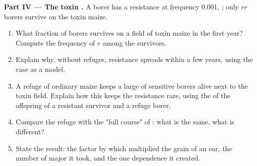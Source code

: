 \begin{problem}
\medskip
\noindent\textbf{Part IV --- The toxin .}
A borer  has a resistance  at frequency 0.001,
; only $rr$ borers survive on the toxin maize.
\begin{enumerate}[resume]
  \item What fraction of borers survives on a field of toxin maize in
        the first year? Compute the frequency of $r$ among the
        survivors.
  \item Explain why, without refuges, resistance spreads within a few
        years, using the  case as a model.
  \item A refuge of ordinary maize keeps a large  of
        sensitive borers alive next to the toxin field. Explain how
        this keeps the resistance  rare, using the  of
        the offspring of a resistant survivor and a refuge borer.
  \item Compare the refuge with the "full course" of : what
        is the same, what is different?
  \item State the result: the factor by which  multiplied
        the grain of an ear, the number of major  it took, and
        the one dependence it created.
\end{enumerate}
\end{problem}
